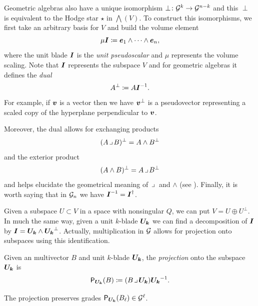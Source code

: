 \documentclass{article}
\begin{document}
Geometric algebras also have a unique isomorphism $\perp \colon \mathcal{G}^k \to \mathcal{G}^{n-k}$ and this $\perp$ is equivalent to the Hodge star $\star$ in $\bigwedge(V)$. To construct this isomorphisms, we first take an arbitrary basis for $V$ and build the volume element
\begin{equation}
    \mu \boldsymbol{I} \coloneqq \boldsymbol{e}_1 \wedge \cdots \wedge \boldsymbol{e}_n,
\end{equation}
where the unit blade $\boldsymbol{I}$ is the \emph{unit pseudoscalar} and $\mu$ represents the volume scaling. Note that $\boldsymbol{I}$ represents the subspace $V$ and for geometric algebras it defines the \emph{dual}
\begin{equation}
\label{eq:dual}
A^\perp \coloneqq A\boldsymbol{I}^{-1}.
\end{equation}
For example, if $\boldsymbol{v}$ is a vector then we have $\boldsymbol{v}^\perp$ is a pseudovector representing a scaled copy of the hyperplane perpendicular to $\boldsymbol{v}$.

Moreover, the dual allows for exchanging products
\begin{equation}
(A\hspace*{.5mm}\lrcorner \hspace*{.5mm} B)^\perp = A\wedge B^\perp
\end{equation}
and the exterior product
\begin{equation}
(A\wedge B)^\perp = A\hspace*{.5mm}\lrcorner \hspace*{.5mm} B^\perp
\end{equation}
and helps elucidate the geometrical meaning of $\hspace*{.5mm}\lrcorner \hspace*{.5mm}$ and $\wedge$ (see \cite{chisolm_geometric_2012}). Finally, it is worth saying that in $\mathcal{G}_n$ we have $\boldsymbol{I}^{-1}=\boldsymbol{I}^\dagger$.

Given a subspace $U\subset V$ in a space with nonsingular $Q$, we can put $V=U \oplus U^\perp$. In much the same way, given a unit $k$-blade $\boldsymbol{U_k}$ we can find a decomposition of $\boldsymbol{I}$ by $\boldsymbol{I} = \boldsymbol{U_k}\wedge \boldsymbol{U_k}^\perp$. Actually, multiplication in $\mathcal{G}$ allows for projection onto subspaces using this identification.
\begin{definition}
Given an multivector $B$ and unit $k$-blade $\boldsymbol{U_k}$, the \emph{projection} onto the subspace $\boldsymbol{U_k}$ is
\begin{equation}
\label{eq:projection}
\mathsf{P}_{\boldsymbol{U_k}}(B) \coloneqq (B\hspace*{.5mm}\lrcorner \hspace*{.5mm} \boldsymbol{U_k}) \boldsymbol{U_k}^{-1}.
\end{equation}
\end{definition}
The projection preserves grades $\mathsf{P}_{\boldsymbol{U_k}}(B_\ell)\in \mathcal{G}^\ell$. 
\end{document}

